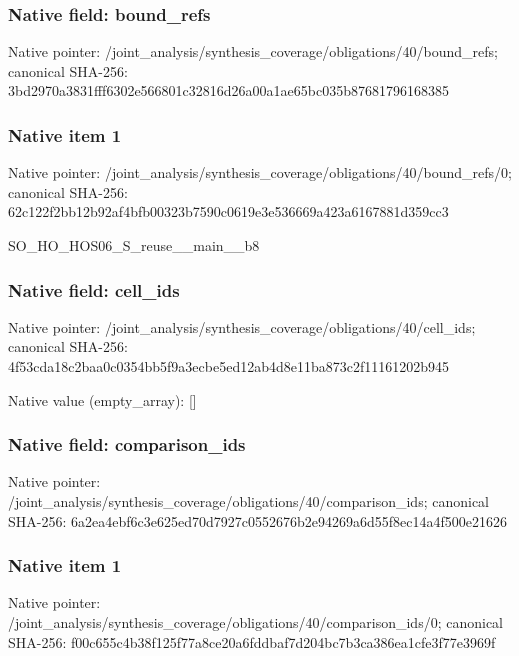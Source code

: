 \documentclass[10pt,a4paper]{article}
\begin{document}
\subsubsection{Native field: bound\_\allowbreak{}refs}
Native pointer: /joint\_\allowbreak{}analysis/synthesis\_\allowbreak{}coverage/obligations/40/bound\_\allowbreak{}refs; canonical SHA-256: 3bd2970a3831fff6302e566801c32816d26a00a1ae65bc035b87681796168385

\subsubsection{Native item 1}
Native pointer: /joint\_\allowbreak{}analysis/synthesis\_\allowbreak{}coverage/obligations/40/bound\_\allowbreak{}refs/0; canonical SHA-256: 62c122f2bb12b92af4bfb00323b7590c0619e3e536669a423a6167881d359cc3

\begingroup\raggedright\sloppy SO\_\allowbreak{}HO\_\allowbreak{}HOS06\_\allowbreak{}S\_\allowbreak{}reuse\_\allowbreak{}\_\allowbreak{}main\_\allowbreak{}\_\allowbreak{}b8\par\endgroup

\subsubsection{Native field: cell\_\allowbreak{}ids}
Native pointer: /joint\_\allowbreak{}analysis/synthesis\_\allowbreak{}coverage/obligations/40/cell\_\allowbreak{}ids; canonical SHA-256: 4f53cda18c2baa0c0354bb5f9a3ecbe5ed12ab4d8e11ba873c2f11161202b945

Native value (empty\_\allowbreak{}array): []

\subsubsection{Native field: comparison\_\allowbreak{}ids}
Native pointer: /joint\_\allowbreak{}analysis/synthesis\_\allowbreak{}coverage/obligations/40/comparison\_\allowbreak{}ids; canonical SHA-256: 6a2ea4ebf6c3e625ed70d7927c0552676b2e94269a6d55f8ec14a4f500e21626

\subsubsection{Native item 1}
Native pointer: /joint\_\allowbreak{}analysis/synthesis\_\allowbreak{}coverage/obligations/40/comparison\_\allowbreak{}ids/0; canonical SHA-256: f00c655c4b38f125f77a8ce20a6fddbaf7d204bc7b3ca386ea1cfe3f77e3969f
\end{document}
